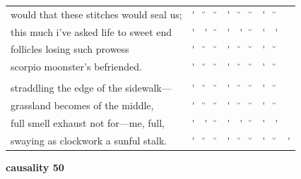 \documentclass[12pt, landscape]{article}
\begin{document}
\begin{center}
\begin{tabularx}{\textwidth}{
>{\lefting\arraybackslash}X
c
c
c
c
c
c
c
c
c
}

would that these stitches would seal us; & \'{} & \u{} & \u{} & \'{} & \u{} & \u{} & \'{} & \u{} & \\
this much i've asked life to sweet end & \'{} & \'{} & \u{} & \'{} & \'{} & \u{} & \'{} & \'{} & \\
follicles losing such prowess & \'{} & \u{} & \u{} & \'{} & \u{} & \u{} & \'{} & \u{} & \\
scorpio moonster's befriended. & \'{} & \u{} & \u{} & \'{} & \u{} & \u{} & \'{} & \u{} & \\
 & & & & & & & & \\
straddling the edge of the sidewalk--- & \'{} & \u{} & \u{} & \'{} & \u{} & \u{} & \'{} & \u{} & \\
grassland becomes of the middle, & \'{} & \u{} & \u{} & \'{} & \u{} & \u{} & \'{} & \u{} & \\
full smell exhaust not for---me, full, & \'{} & \'{} & \u{} & \'{} & \'{} & \u{} & \'{} & \'{} & \\
swaying as clockwork a sunful stalk. & \'{} & \u{} & \u{} & \'{} & \u{} & \u{} & \'{} & \u{} & \'{} \\

\end{tabularx}
\end{center}

\vspace*{\fill}

\newpage

\vspace*{\fill}

\noindent \textbf{causality 50}
\noindent \hfill \par
\end{document}
